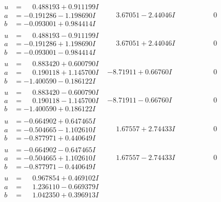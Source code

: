 \documentclass[1p]{elsarticle_modified}
\theoremstyle{definition}
\begin{document}
$$\begin{array}{c|c|c}
\begin{aligned}
u &= \phantom{-}0.488193 + 0.911199 I \\
a &= -0.191286 - 1.198690 I \\
b &= -0.093001 + 0.984414 I\end{aligned}
 & \phantom{-}3.67051 - 2.44046 I & \phantom{-0.000000 } 0 \\ \hline\begin{aligned}
u &= \phantom{-}0.488193 - 0.911199 I \\
a &= -0.191286 + 1.198690 I \\
b &= -0.093001 - 0.984414 I\end{aligned}
 & \phantom{-}3.67051 + 2.44046 I & \phantom{-0.000000 } 0 \\ \hline\begin{aligned}
u &= \phantom{-}0.883420 + 0.600790 I \\
a &= \phantom{-}0.190118 + 1.145700 I \\
b &= -1.400590 - 0.186122 I\end{aligned}
 & -8.71911 + 0.66760 I & \phantom{-0.000000 } 0 \\ \hline\begin{aligned}
u &= \phantom{-}0.883420 - 0.600790 I \\
a &= \phantom{-}0.190118 - 1.145700 I \\
b &= -1.400590 + 0.186122 I\end{aligned}
 & -8.71911 - 0.66760 I & \phantom{-0.000000 } 0 \\ \hline\begin{aligned}
u &= -0.664902 + 0.647465 I \\
a &= -0.504665 - 1.102610 I \\
b &= -0.877971 + 0.440649 I\end{aligned}
 & \phantom{-}1.67557 + 2.74433 I & \phantom{-0.000000 } 0 \\ \hline\begin{aligned}
u &= -0.664902 - 0.647465 I \\
a &= -0.504665 + 1.102610 I \\
b &= -0.877971 - 0.440649 I\end{aligned}
 & \phantom{-}1.67557 - 2.74433 I & \phantom{-0.000000 } 0 \\ \hline\begin{aligned}
u &= \phantom{-}0.967854 + 0.469102 I \\
a &= \phantom{-}1.236110 - 0.669379 I \\
b &= \phantom{-}1.042350 + 0.396913 I\end{aligned}

\end{array}$$
\end{document}
